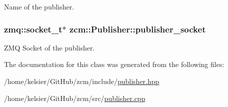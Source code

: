 Name of the publisher. 

\hypertarget{classzcm_1_1Publisher_acb22f36a592a5a0beaf4100e472578d5}{
\subsubsection[{publisher\-\_\-socket}]{\setlength{\rightskip}{0pt plus 5cm}zmq\-::socket\-\_\-t$\ast$ zcm\-::\-Publisher\-::publisher\-\_\-socket\hspace{0.3cm}{\ttfamily [private]}}}\label{classzcm_1_1Publisher_acb22f36a592a5a0beaf4100e472578d5}


Z\-M\-Q Socket of the publisher. 



The documentation for this class was generated from the following files\-:\begin{DoxyCompactItemize}
\item 
/home/kelsier/\-Git\-Hub/zcm/include/\hyperlink{publisher_8hpp}{publisher.\-hpp}\item 
/home/kelsier/\-Git\-Hub/zcm/src/\hyperlink{publisher_8cpp}{publisher.\-cpp}\end{DoxyCompactItemize}
